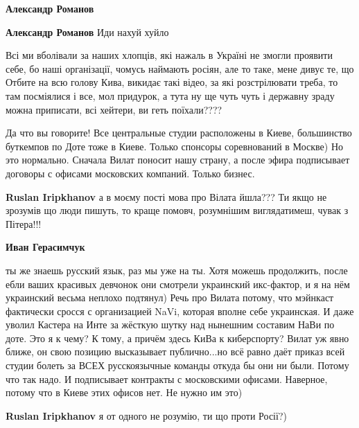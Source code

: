 \begin{itemize}
\begin{itemize}
\begin{itemize} %
\textbf{Александр Романов}

\textbf{Александр Романов}
Иди нахуй хуйло
\end{itemize} %

\end{itemize} %


Всі ми вболівали за наших хлопців, які нажаль в Україні не змогли проявити
себе, бо наші організації, чомусь наймають росіян, але то таке, мене дивує те,
що Отбите на всю голову Кива, викидає такі відео, за які розстрілювати треба,
то там посміялися і все, мол придурок, а тута ну ще чуть чуть і державну зраду
можна приписати, всі хейтери, ви геть поїхали????

\begin{itemize} %

Да что вы говорите! Все центральные студии расположены в Киеве, большинство
буткемпов по Доте тоже в Киеве. Только спонсоры соревнований в Москве) Но это
нормально. Сначала Вилат поносит нашу страну, а после эфира подписывает
договоры с офисами московских компаний. Только бизнес.

\begin{itemize} %
\textbf{Ruslan Iripkhanov} а в моєму пості мова про Вілата йшла??? Ти якщо не зрозумів що люди пишуть, то краще помовч, розумнішим виглядатимеш, чувак з Пітера!!!

\textbf{Иван Герасимчук} 

ты же знаешь русский язык, раз мы уже на ты. Хотя можешь продолжить, после ебли
ваших красивых девчонок они смотрели украинский икс-фактор, и я на нём
украинский весьма неплохо подтянул) Речь про Вилата потому, что мэйнкаст
фактически сросся с организацией NaVi, которая вполне себе украинская. И даже
уволил Кастера на Инте за жёсткую шутку над нынешним составим НаВи по доте. Это
я к чему? К тому, а причём здесь КиВа к киберспорту? Вилат уж явно ближе, он
свою позицию высказывает публично...но всё равно даёт приказ всей студии болеть
за ВСЕХ русскоязычные команды откуда бы они ни были. Потому что так надо. И
подписывает контракты с московскими офисами. Наверное, потому что в Киеве этих
офисов нет. Не нужно им это)


\textbf{Ruslan Iripkhanov} я от одного не розумію, ти що проти Росії?)


\end{itemize}
\end{itemize}
\end{itemize}
